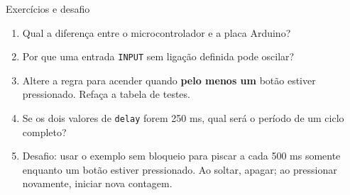 \begin{frame}[t]{Exercícios e desafio}
\begin{enumerate}
\item Qual a diferença entre o microcontrolador e a placa Arduino?
\item Por que uma entrada \texttt{INPUT} sem ligação definida pode oscilar?
\item Altere a regra para acender quando \textbf{pelo menos um} botão estiver pressionado. Refaça a tabela de testes.
\item Se os dois valores de \texttt{delay} forem 250 ms, qual será o período de um ciclo completo?
\item Desafio: usar o exemplo sem bloqueio para piscar a cada 500 ms somente enquanto um botão estiver pressionado. Ao soltar, apagar; ao pressionar novamente, iniciar nova contagem.
\end{enumerate}
\end{frame}
